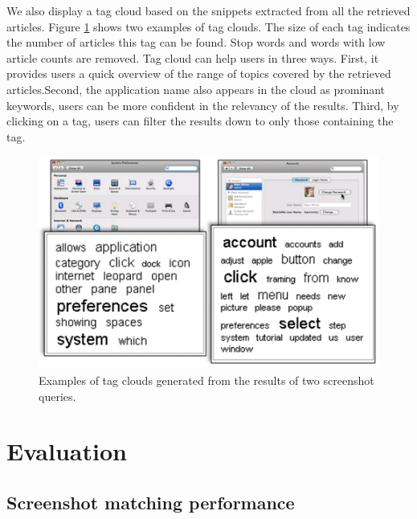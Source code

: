 \documentclass{www2010-submission}
\begin{document}
We also display a tag cloud based on the snippets extracted from all
the retrieved articles. Figure \ref{fig:tag_clouds} shows two examples
of tag clouds.  The size of each tag indicates the number of articles
this tag can be found.  Stop words and words with low article counts
are removed. Tag cloud can help users in three ways. First, it
provides users a quick overview of the range of topics covered by the
retrieved articles.Second, the application name also appears in the
cloud as prominant keywords, users can be more confident in the
relevancy of the results. Third, by clicking on a tag, users can
filter the results down to only those containing the tag.

\begin{figure}
\includegraphics[width=1\columnwidth]{figure/tag_clouds.png}
\caption{Examples of tag clouds generated from the 
results of two screenshot queries.}
\label{fig:tag_clouds}
\end{figure}


\section{Evaluation}

\subsection{Screenshot matching performance}
\end{document}
